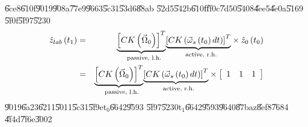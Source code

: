 \documentclass[12pt]{article}
\begin{document}
\U{6ce8}\U{610f}\U{9019}\U{908a}\U{77e9}\U{9663}\U{5c31}\U{53d6}\U{88ab}%
\U{52d5}\U{542b}\U{610f}\U{ff0c}\U{7d50}\U{5408}\U{4ee5}\U{4e0a}\U{5169}%
\U{5f0f}\U{5f97}\U{5230}%
\begin{eqnarray*}
\hat{z}_{lab}\left( t_{1}\right) &=&\underset{\text{passive, l.h.}}{%
\underbrace{\left[ CK\left( \vec{\Omega}_{0}\right) \right] ^{T}}}\underset{%
\text{active, r.h.}}{\underbrace{\left[ CK\left( \vec{\omega}_{s}\left(
t_{0}\right) dt\right) \right] ^{T}}}\times \hat{z}_{0}\left( t_{0}\right) \\
&=&\underset{\text{passive, l.h.}}{\underbrace{\left[ CK\left( \vec{\Omega}%
_{0}\right) \right] ^{T}}}\underset{\text{active, r.h.}}{\underbrace{\left[
CK\left( \vec{\omega}_{s}\left( t_{0}\right) dt\right) \right] ^{T}}}\times %
\left[ 
\begin{array}{ccc}
1 & 1 & 1%
\end{array}%
\right]
\end{eqnarray*}%
\U{9019}\U{6a23}\U{6211}\U{5011}\U{5c31}\U{5f9e}t$_{0}$\U{6642}\U{9593}%
\U{5f97}\U{5230}t$_{1}$\U{6642}\U{9593}\U{9640}\U{87ba}z\U{8ef8}\U{7684}%
\U{4f4d}\U{7f6e}\U{3002}
\end{document}
